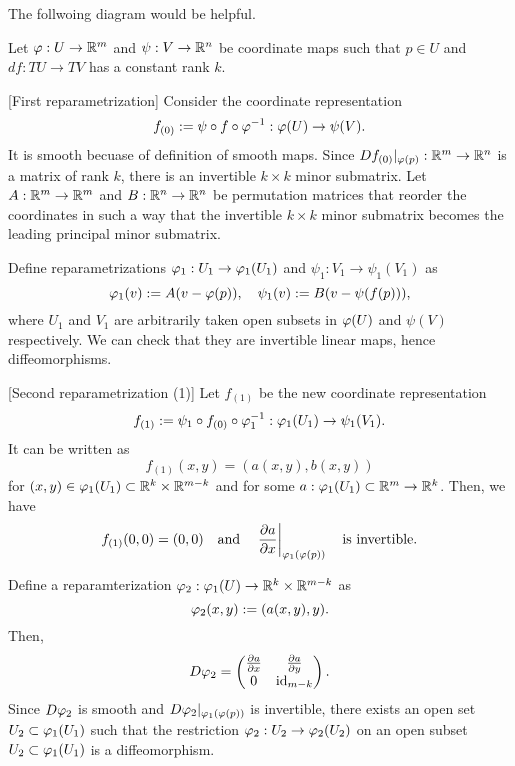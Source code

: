\documentclass{../note}
\begin{document}
\begin{pf}
The follwoing diagram would be helpful.

Let $\varphi:U\to\mathbb{R}^m$ and $\psi:V\to\mathbb{R}^n$ be coordinate maps such that $p\in U$ and $df:TU\to TV$ has a constant rank $k$.

[First reparametrization]
Consider the coordinate representation
\[f_{(0)}:=\psi\circ f\circ\varphi^{-1}:\varphi(U)\to\psi(V).\]
It is smooth becuase of definition of smooth maps.
Since $Df_{(0)}|_{\varphi(p)}:\mathbb{R}^m\to\mathbb{R}^n$ is a matrix of rank $k$, there is an invertible $k\times k$ minor submatrix.
Let $A:\mathbb{R}^m\to\mathbb{R}^m$ and $B:\mathbb{R}^n\to\mathbb{R}^n$ be permutation matrices that reorder the coordinates in such a way that the invertible $k\times k$ minor submatrix becomes the leading principal minor submatrix.

Define reparametrizations $\varphi_1:U_1\to\varphi_1(U_1)$ and $\psi_1:V_1\to\psi_1(V_1)$ as
\[\varphi_1(v):=A(v-\varphi(p)),\quad\psi_1(v):=B(v-\psi(f(p))),\]
where $U_1$ and $V_1$ are arbitrarily taken open subsets in $\varphi(U)$ and $\psi(V)$ respectively.
We can check that they are invertible linear maps, hence diffeomorphisms.

[Second reparametrization (1)]
Let $f_{(1)}$ be the new coordinate representation
\[f_{(1)}:=\psi_1\circ f_{(0)}\circ\varphi_1^{-1}:\varphi_1(U_1)\to\psi_1(V_1).\]
It can be written as
\[f_{(1)}(x,y)=(a(x,y),b(x,y))\]
for $(x,y)\in\varphi_1(U_1)\subset\mathbb{R}^k\times\mathbb{R}^{m-k}$ and for some $a:\varphi_1(U_1)\subset\mathbb{R}^m\to\mathbb{R}^k$.
Then, we have
\[f_{(1)}(0,0)=(0,0)\quad\text{and}\quad\left.\pd{a}{x}\right|_{\f_1(\f(p))}\quad\text{is invertible.}\]

Define a reparamterization $\varphi_2:\varphi_1(U)\to\mathbb{R}^k\times\mathbb{R}^{m-k}$ as
\[\varphi_2(x,y):=(a(x,y),y).\]
Then,
\[D\f_2=\begin{pmatrix}\pd{a}{x}&\pd{a}{y}\\0&\id_{m-k}\end{pmatrix}.\]
Since $D\varphi_2$ is smooth and $D\varphi_2|_{\varphi_1(\varphi(p))}$ is invertible, there exists an open set $U_2\subset\varphi_1(U_1)$ such that the restriction $\varphi_2:U_2\to\varphi_2(U_2)$ on an open subset $U_2\subset\varphi_1(U_1)$ is a diffeomorphism.


\end{pf}
\end{document}
